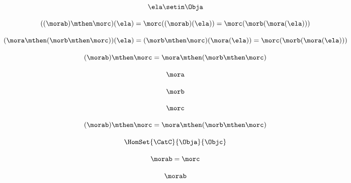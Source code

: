 \begin{forslides}
    \begin{equation}
        \label{eq:semicats-slides-98}
        \ela \setin \Obja
    \end{equation}

    \begin{equation}
        \label{eq:semicats-slides-99}
        ((\morab) \mthen \morc)(\ela) =  \morc((\morab)(\ela)) = \morc (\morb (\mora (\ela)))
    \end{equation}

    \begin{equation}
        \label{eq:semicats-slides-99b}
        (\mora \mthen (\morb \mthen \morc))(\ela)
        =  (\morb \mthen \morc)(\mora(\ela)) = \morc (\morb (\mora (\ela)))
    \end{equation}

    \begin{equation}
        \label{eq:semicats-slides-100}
        (\morab)
        \mthen \morc = \mora \mthen (\morb \mthen \morc)
    \end{equation}

    \begin{equation}
        \label{eq:semicats-slides-101}
        \mora
    \end{equation}

    \begin{equation}
        \label{eq:semicats-slides-102}
        \morb
    \end{equation}

    \begin{equation}
        \label{eq:semicats-slides-103}
        \morc
    \end{equation}

    \begin{equation}
        \label{eq:semicats-slides-104}
        (\morab) \mthen \morc = \mora \mthen (\morb \mthen \morc)
    \end{equation}

    \begin{equation}
        \label{eq:semicats-slides-105}
        \HomSet{\CatC}{\Obja}{\Objc}
    \end{equation}

    \begin{equation}
        \label{eq:semicats-slides-106}
        \morab = \morc
    \end{equation}

    \begin{equation}
        \label{eq:semicats-slides-107}
        \morab
    \end{equation}


\end{forslides}

